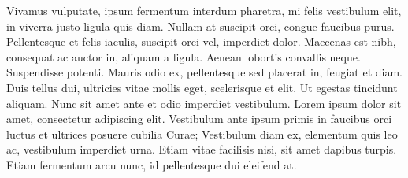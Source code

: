 Vivamus vulputate, ipsum fermentum interdum pharetra, mi felis vestibulum elit, in viverra justo ligula quis diam. Nullam at suscipit orci, congue faucibus purus. Pellentesque et felis iaculis, suscipit orci vel, imperdiet dolor. Maecenas est nibh, consequat ac auctor in, aliquam a ligula. Aenean lobortis convallis neque. Suspendisse potenti. Mauris odio ex, pellentesque sed placerat in, feugiat et diam. Duis tellus dui, ultricies vitae mollis eget, scelerisque et elit. Ut egestas tincidunt aliquam. Nunc sit amet ante et odio imperdiet vestibulum. Lorem ipsum dolor sit amet, consectetur adipiscing elit. Vestibulum ante ipsum primis in faucibus orci luctus et ultrices posuere cubilia Curae; Vestibulum diam ex, elementum quis leo ac, vestibulum imperdiet urna. Etiam vitae facilisis nisi, sit amet dapibus turpis. Etiam fermentum arcu nunc, id pellentesque dui eleifend at.